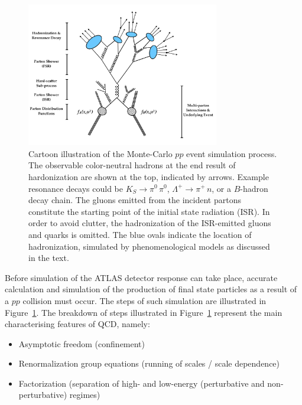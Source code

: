 \begin{figure}[!htb]
    \begin{center}
        \includegraphics[width=0.75\textwidth]{figures/event_simulation/pp_sim_cartoonPDF}
        \caption{
            Cartoon illustration of the Monte-Carlo $pp$ event simulation process.
            The observable color-neutral hadrons at the end result of hardonization are shown at the
            top, indicated by arrows.
            Example resonance decays could be $K_S \rightarrow \pi^0\,\pi^0$, $\Lambda^+ \rightarrow \pi^+\,n$, or a
            $B$-hadron decay chain.
            The gluons emitted from the incident partons constitute the starting point of the initial state radiation (ISR).
            In order to avoid clutter, the hadronization of the ISR-emitted gluons and quarks is omitted.
            The blue ovals indicate the location of hadronization, simulated by phenomenological models as discussed in the text.
        }
        \label{fig:pp_sim_steps}
    \end{center}
\end{figure}

Before simulation of the ATLAS detector response can take place, accurate calculation and simulation of the production of final
state particles as a result of a $pp$ collision must occur.
The steps of such simulation are illustrated in Figure~\ref{fig:pp_sim_steps}.
The breakdown of steps illustrated in Figure~\ref{fig:pp_sim_steps} represent the main characterising features
of QCD, namely: 
\begin{itemize}
    \item Asymptotic freedom (confinement)
    \item Renormalization group equations (running of scales / scale dependence)
    \item Factorization (separation of high- and low-energy (perturbative and non-perturbative) regimes)
\end{itemize}


